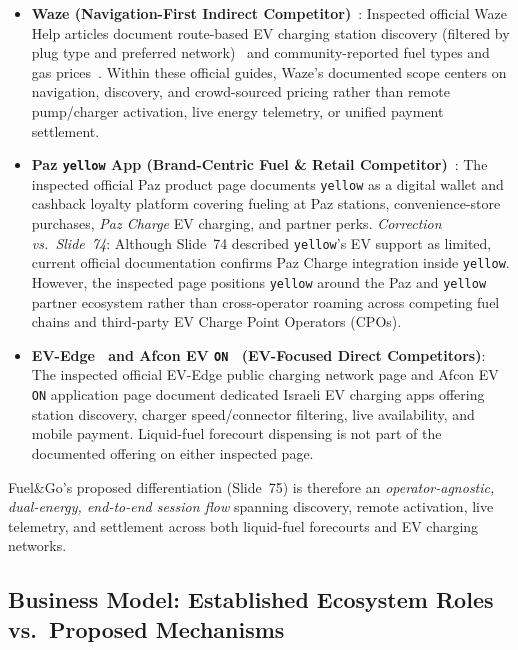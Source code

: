 \begin{itemize}[leftmargin=1.4em, itemsep=2pt]
  \item \textbf{Waze (Navigation-First Indirect Competitor)}~\cite{waze2025help,waze2025gas}: Inspected official Waze Help articles document route-based EV charging station discovery (filtered by plug type and preferred network)~\cite{waze2025help} and community-reported fuel types and gas prices~\cite{waze2025gas}. Within these official guides, Waze's documented scope centers on navigation, discovery, and crowd-sourced pricing rather than remote pump/charger activation, live energy telemetry, or unified payment settlement.
  \item \textbf{Paz \texttt{yellow} App (Brand-Centric Fuel \& Retail Competitor)}~\cite{paz2025yellow}: The inspected official Paz product page documents \texttt{yellow} as a digital wallet and cashback loyalty platform covering fueling at Paz stations, convenience-store purchases, \emph{Paz Charge} EV charging, and partner perks. \emph{Correction vs.\ Slide~74}: Although Slide~74 described \texttt{yellow}'s EV support as limited, current official documentation confirms Paz Charge integration inside \texttt{yellow}. However, the inspected page positions \texttt{yellow} around the Paz and \texttt{yellow} partner ecosystem rather than cross-operator roaming across competing fuel chains and third-party EV Charge Point Operators (CPOs).
  \item \textbf{EV-Edge~\cite{evedge2025app} and Afcon EV \texttt{ON}~\cite{afconev2025on} (EV-Focused Direct Competitors)}: The inspected official EV-Edge public charging network page and Afcon EV \texttt{ON} application page document dedicated Israeli EV charging apps offering station discovery, charger speed/connector filtering, live availability, and mobile payment. Liquid-fuel forecourt dispensing is not part of the documented offering on either inspected page.
\end{itemize}

Fuel\&Go's proposed differentiation (Slide~75) is therefore an \emph{operator-agnostic, dual-energy, end-to-end session flow} spanning discovery, remote activation, live telemetry, and settlement across both liquid-fuel forecourts and EV charging networks.

\subsection{Business Model: Established Ecosystem Roles vs.\ Proposed Mechanisms}
\label{sec:business-model}

